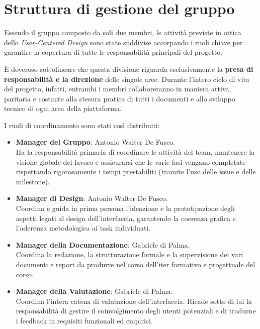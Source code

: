 \section{Struttura di gestione del gruppo}

Essendo il gruppo composto da soli due membri, le attività previste in ottica dello \textit{User-Centered Design} sono state suddivise accorpando i ruoli chiave per garantire la copertura di tutte le responsabilità principali del progetto.

È doveroso sottolineare che questa divisione riguarda esclusivamente la \textbf{presa di responsabilità e la direzione} delle singole aree. Durante l'intero ciclo di vita del progetto, infatti, entrambi i membri collaboreranno in maniera attiva, paritaria e costante alla stesura pratica di tutti i documenti e allo sviluppo tecnico di ogni area della piattaforma.

I ruoli di coordinamento sono stati così distribuiti:

\begin{itemize}
    \item \textbf{Manager del Gruppo}: Antonio Walter De Fusco.\\ Ha la responsabilità primaria di coordinare le attività del team, mantenere la visione globale del lavoro e assicurarsi che le varie fasi vengano completate rispettando rigorosamente i tempi prestabiliti (tramite l'uso delle issue e delle milestone).
    
    \item \textbf{Manager di Design}: Antonio Walter De Fusco.\\ Coordina e guida in prima persona l'ideazione e la prototipazione degli aspetti legati al design dell'interfaccia, garantendo la coerenza grafica e l'aderenza metodologica ai task individuati.

    \item \textbf{Manager della Documentazione}: Gabriele di Palma.\\ Coordina la redazione, la strutturazione formale e la supervisione dei vari documenti e report da produrre nel corso dell'iter formativo e progettuale del corso.
    
    \item \textbf{Manager della Valutazione}: Gabriele di Palma.\\ Coordina l'intera catena di valutazione dell'interfaccia. Ricade sotto di lui la responsabilità di gestire il coinvolgimento degli utenti potenziali e di tradurne i feedback in requisiti funzionali ed empirici.
\end{itemize}
